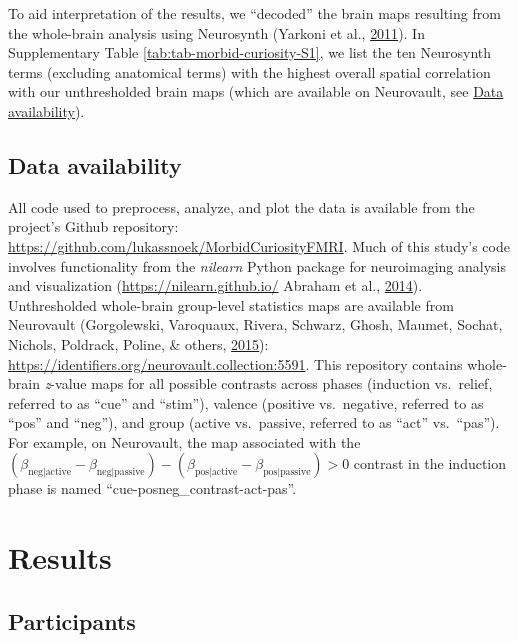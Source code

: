\documentclass[11pt,american,a4paper,oneside,]{memoir} %
\begin{document}
To aid interpretation of the results, we ``decoded'' the brain maps resulting from the whole-brain analysis using Neurosynth (Yarkoni et al., \protect\hyperlink{ref-yarkoni2011large}{2011}). In Supplementary Table \ref{tab:tab-morbid-curiosity-S1}, we list the ten Neurosynth terms (excluding anatomical terms) with the highest overall spatial correlation with our unthresholded brain maps (which are available on Neurovault, see \protect\hyperlink{morbid-curiosity-data-availability}{Data availability}).

\hypertarget{morbid-curiosity-data-availability}{%
\subsection{Data availability}\label{morbid-curiosity-data-availability}}

All code used to preprocess, analyze, and plot the data is available from the project's Github repository: \url{https://github.com/lukassnoek/MorbidCuriosityFMRI}. Much of this study's code involves functionality from the \emph{nilearn} Python package for neuroimaging analysis and visualization (\url{https://nilearn.github.io/} Abraham et al., \protect\hyperlink{ref-Abraham2014-ef}{2014}). Unthresholded whole-brain group-level statistics maps are available from Neurovault (Gorgolewski, Varoquaux, Rivera, Schwarz, Ghosh, Maumet, Sochat, Nichols, Poldrack, Poline, \& others, \protect\hyperlink{ref-gorgolewski2015neurovault}{2015}): \url{https://identifiers.org/neurovault.collection:5591}. This repository contains whole-brain \emph{z}-value maps for all possible contrasts across phases (induction vs.~relief, referred to as ``cue'' and ``stim''), valence (positive vs.~negative, referred to as ``pos'' and ``neg''), and group (active vs.~passive, referred to as ``act'' vs.~``pas''). For example, on Neurovault, the map associated with the \((\beta_{\mathrm{neg | active}} - \beta_{\mathrm{neg | passive}}) - (\beta_{\mathrm{pos | active}} - \beta_{\mathrm{pos | passive}}) > 0\) contrast in the induction phase is named ``cue-posneg\_contrast-act-pas''.

\hypertarget{morbid-curiosity-results}{%
\section{Results}\label{morbid-curiosity-results}}

\hypertarget{morbid-curiosity-results-participants}{%
\subsection{Participants}\label{morbid-curiosity-results-participants}}
\end{document}
